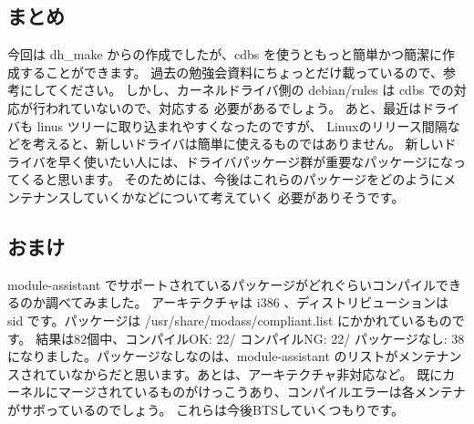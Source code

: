 \documentclass[mingoth,a4paper]{jsarticle}
\begin{document}
\subsection{まとめ}
今回は dh\_make からの作成でしたが、cdbs を使うともっと簡単かつ簡潔に作成することができます。
過去の勉強会資料にちょっとだけ載っているので、参考にしてください。
しかし、カーネルドライバ側の debian/rules は cdbs での対応が行われていないので、対応する
必要があるでしょう。
あと、最近はドライバも linus ツリーに取り込まれやすくなったのですが、
Linuxのリリース間隔などを考えると、新しいドライバは簡単に使えるものではありません。
新しいドライバを早く使いたい人には、ドライバパッケージ群が重要なパッケージになってくると思います。
そのためには、今後はこれらのパッケージをどのようにメンテナンスしていくかなどについて考えていく
必要がありそうです。

\subsection{おまけ}
module-assistant でサポートされているパッケージがどれぐらいコンパイルできるのか調べてみました。
アーキテクチャは i386 、ディストリビューションは sid です。パッケージは /usr/share/modass/compliant.list にかかれているものです。
結果は82個中、コンパイルOK: 22/ コンパイルNG: 22/ パッケージなし: 38 になりました。パッケージなしなのは、module-assistant のリストがメンテナンスされていなからだと思います。あとは、アーキテクチャ非対応など。
既にカーネルにマージされているものがけっこうあり、コンパイルエラーは各メンテナがサボっているのでしょう。
これらは今後BTSしていくつもりです。
 
\clearpage
\end{document}
